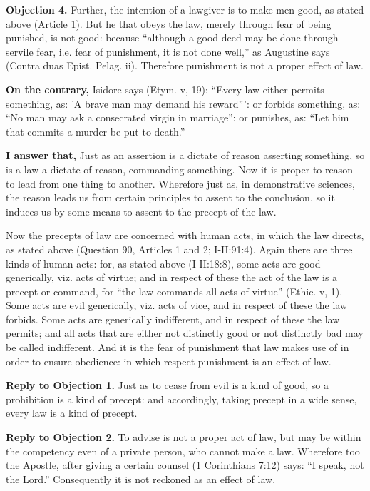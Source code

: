 \textbf{Objection 4.} Further, the intention of a lawgiver is to make men good, as stated above (Article 1). But he that obeys the law, merely through fear of being punished, is not good: because ``although a good deed may be done through servile fear, i.e. fear of punishment, it is not done well,'' as Augustine says (Contra duas Epist. Pelag. ii). Therefore punishment is not a proper effect of law.

\textbf{On the contrary,} Isidore says (Etym. v, 19): ``Every law either permits something, as: 'A brave man may demand his reward''': or forbids something, as: ``No man may ask a consecrated virgin in marriage'': or punishes, as: ``Let him that commits a murder be put to death.''

\textbf{I answer that,} Just as an assertion is a dictate of reason asserting something, so is a law a dictate of reason, commanding something. Now it is proper to reason to lead from one thing to another. Wherefore just as, in demonstrative sciences, the reason leads us from certain principles to assent to the conclusion, so it induces us by some means to assent to the precept of the law.

Now the precepts of law are concerned with human acts, in which the law directs, as stated above (Question 90, Articles 1 and 2; I-II:91:4). Again there are three kinds of human acts: for, as stated above (I-II:18:8), some acts are good generically, viz. acts of virtue; and in respect of these the act of the law is a precept or command, for ``the law commands all acts of virtue'' (Ethic. v, 1). Some acts are evil generically, viz. acts of vice, and in respect of these the law forbids. Some acts are generically indifferent, and in respect of these the law permits; and all acts that are either not distinctly good or not distinctly bad may be called indifferent. And it is the fear of punishment that law makes use of in order to ensure obedience: in which respect punishment is an effect of law.

\textbf{Reply to Objection 1.} Just as to cease from evil is a kind of good, so a prohibition is a kind of precept: and accordingly, taking precept in a wide sense, every law is a kind of precept.

\textbf{Reply to Objection 2.} To advise is not a proper act of law, but may be within the competency even of a private person, who cannot make a law. Wherefore too the Apostle, after giving a certain counsel (1 Corinthians 7:12) says: ``I speak, not the Lord.'' Consequently it is not reckoned as an effect of law.


